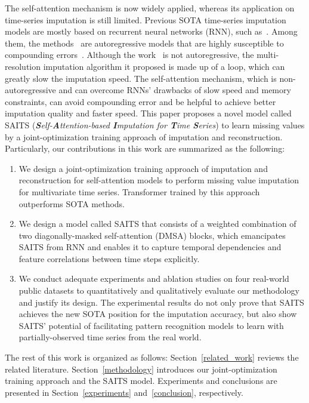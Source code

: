 \documentclass{article}
\begin{document}
The self-attention mechanism is now widely applied, whereas its application on time-series imputation is still limited. Previous SOTA time-series imputation models are mostly based on recurrent neural networks (RNN), such as~\cite{Cao2018BRITS, Yoon2019MRNN, Luo2018GRUI, Luo2019E2GAN, Liu2019NAOMI}. Among them, the methods~\cite{Cao2018BRITS, Yoon2019MRNN, Luo2018GRUI, Luo2019E2GAN} are autoregressive models that are highly susceptible to compounding errors~\cite{Venkatraman2015TimeSeries,Liu2019NAOMI}. Although the work~\cite{Liu2019NAOMI} is not autoregressive, the multi-resolution imputation algorithm it proposed is made up of a loop, which can greatly slow the imputation speed. The self-attention mechanism, which is non-autoregressive and can overcome RNNs' drawbacks of slow speed and memory constraints, can avoid compounding error and be helpful to achieve better imputation quality and faster speed. This paper proposes a novel model called SAITS (\textit{\textbf{S}elf-\textbf{A}ttention-based \textbf{I}mputation for \textbf{T}ime \textbf{S}eries}) to learn missing values by a joint-optimization training approach of imputation and reconstruction. Particularly, our contributions in this work are summarized as the following:
\renewcommand{\theenumi}{\Roman{enumi}}
\begin{enumerate}
	\item We design a joint-optimization training approach of imputation and reconstruction for self-attention models to perform missing value imputation for multivariate time series. Transformer trained by this approach outperforms SOTA methods.
	\item We design a model called SAITS that consists of a weighted combination of two diagonally-masked self-attention (DMSA) blocks, which emancipates SAITS from RNN and enables it to capture temporal dependencies and feature correlations between time steps explicitly.
	\item We conduct adequate experiments and ablation studies on four real-world public datasets to quantitatively and qualitatively evaluate our methodology and justify its design. The experimental results do not only prove that SAITS achieves the new SOTA position for the imputation accuracy, but also show SAITS' potential of facilitating pattern recognition models to learn with partially-observed time series from the real world.
\end{enumerate}

The rest of this work is organized as follows: Section~\ref{related_work} reviews the related literature.  Section~\ref{methodology} introduces our joint-optimization training approach and the SAITS model. Experiments and conclusions are presented in Section~\ref{experiments} and~\ref{conclusion}, respectively.
\end{document}
